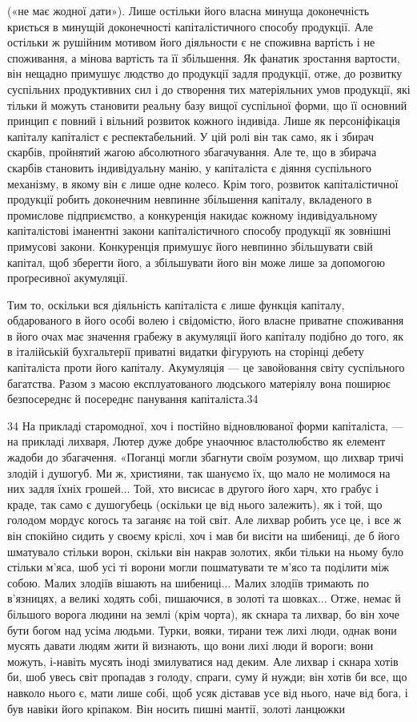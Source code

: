 («не має жодної дати»). Лише остільки його власна минуща
доконечність криється в минущій доконечності капіталістичного
способу продукції. Але остільки ж рушійним мотивом його
діяльности є не споживна вартість і не споживання, а мінова
вартість та її збільшення. Як фанатик зростання вартости, він
нещадно примушує людство до продукції задля продукції, отже,
до розвитку суспільних продуктивних сил і до створення тих
матеріяльних умов продукції, які тільки й можуть становити
реальну базу вищої суспільної форми, що її основний принцип
є повний і вільний розвиток кожного індивіда. Лише як персоніфікація
капіталу капіталіст є респектабельний. У цій ролі
він так само, як і збирач скарбів, пройнятий жагою абсолютного
збагачування. Але те, що в збирача скарбів становить індивідуальну
манію, у капіталіста є діяння суспільного механізму,
в якому він є лише одне колесо. Крім того, розвиток капіталістичної
продукції робить доконечним невпинне збільшення капіталу,
вкладеного в промислове підприємство, а конкуренція накидає
кожному індивідуальному капіталістові іманентні закони
капіталістичного способу продукції як зовнішні примусові закони.
Конкуренція примушує його невпинно збільшувати свій
капітал, щоб зберегти його, а збільшувати його він може лише
за допомогою проґресивної акумуляції.

Тим то, оскільки вся діяльність капіталіста є лише функція
капіталу, обдарованого в його особі волею і свідомістю, його
власне приватне споживання в його очах має значення грабежу
в акумуляції його капіталу подібно до того, як в італійській
бухгальтерії приватні видатки фігурують на сторінці дебету
капіталіста проти його капіталу. Акумуляція — це завойовання
світу суспільного багатства. Разом з масою експлуатованого людського
матеріялу вона поширює безпосереднє й посереднє панування
капіталіста.34

34    На прикладі старомодної, хоч і постійно відновлюваної форми
капіталіста, — на прикладі лихваря, Лютер дуже добре унаочнює властолюбство
як елемент жадоби до збагачення. «Поганці могли збагнути
своїм розумом, що лихвар тричі злодій і душогуб. Ми ж, християни, так
шануємо їх, що мало не молимося на них задля їхніх грошей... Той, хто
висисає в другого його харч, хто грабує і краде, так само є душогубець
(оскільки це від нього залежить), як і той, що голодом мордує когось
та заганяє на той світ. Але лихвар робить усе це, і все ж він спокійно
сидить у своєму кріслі, хоч і мав би висіти на шибениці, де б його шматувало
стільки ворон, скільки він накрав золотих, якби тільки на ньому
було стільки м’яса, шоб усі ті ворони могли пошматувати те м’ясо та
поділити між собою. Малих злодіїв вішають на шибениці... Малих злодіїв
тримають по в’язницях, а великі ходять собі, пишаючися, в золоті
та шовках... Отже, немає й більшого ворога людини на землі (крім чорта),
як скнара та лихвар, бо він хоче бути богом над усіма людьми. Турки,
вояки, тирани теж лихі люди, однак вони мусять давати людям жити й
визнають, що вони лихі люди й вороги; вони можуть, і-навіть мусять
іноді змилуватися над деким. Але лихвар і скнара хотів би, шоб увесь
світ пропадав з голоду, спраги, суму й нужди; він хотів би все, що навколо
нього є, мати лише собі, щоб усяк діставав усе від нього, наче від бога,
і був навіки його кріпаком. Він носить пишні мантії, золоті ланцюжки
